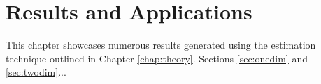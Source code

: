 \chapter{Results and Applications}

This chapter showcases numerous results generated using the estimation
technique outlined in Chapter \ref{chap:theory}. Sections \ref{sec:onedim} and
\ref{sec:twodim}...






